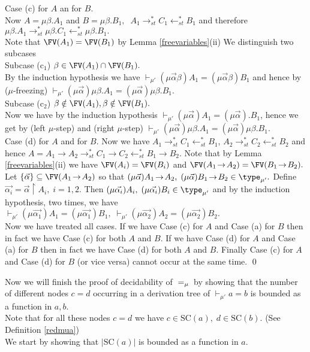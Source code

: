 \documentclass[11pt,aslarticle,xperspectives,bibay3]{asl}
\newcommand\tamua{\type_{\mu'}}
\newcommand\prmua{\vdash_{\mu'}}
\newcommand\redst{\mathrel{\rightarrow^{\ast}_{st}}}
\newcommand\redstl{\mathrel{\leftarrow^{\ast}_{st}}}
\newcommand\alphaarrow{\vec{\alpha}}
\newcommand\alphaiarrow{\vec{\alpha_i}}
\newcommand\alphaeenarrow{\vec{\alpha_1}}
\newcommand\alphatweearrow{\vec{\alpha_2}}
\newcommand\restricted{\!\!\upharpoonright\!\!}
\newcommand\SC{{\mbox {SC}}}
\begin{document}
{Case (c) for $A$ an for $B$.\\
 Now $A=\mu\beta.A_1$ and $B=\mu\beta.B_1,\;\;  A_1\redst C_1\redstl B_1$ and therefore\\ $\mu\beta.A_1\redst \mu\beta.C_1\redstl \mu\beta.B_1.$\\
Note that $\FV(A_1) = \FV(B_1)$ by Lemma \ref{freevariables}(ii)
We distinguish two subcases\\[1em]
Subcase (c$_1$)  $\beta\in\FV(A_1)\cap\FV(B_1).$\\
By the induction hypothesis we have $\prmua(\mu\alphaarrow\beta)A_1=(\mu\alphaarrow\beta)B_1$ and hence by ($\mu$-freezing)  $\prmua(\mu\alphaarrow)\mu\beta.A_1=(\mu\alphaarrow)\mu\beta.B_1.$\\[1em]
Subcase (c$_2$)  $\beta\notin\FV(A_1),\beta\notin\FV(B_1).$\\
Now we have by the induction hypothesis $\prmua(\mu\alphaarrow)A_1=(\mu\alphaarrow).B_1$, hence we get by (left $\mu$-step) and (right $\mu$-step) 
$\prmua(\mu\alphaarrow)\mu\beta.A_1=(\mu\alphaarrow)\mu\beta.B_1.$\\[1em]
Case (d) for $A$ and for $B$.
Now we have $A_1\redst C_1\redstl B_1$,  $A_2\redst C_2\redstl B_2$ and hence  $A=A_1\to A_2\redst C_1\to C_2\redstl B_1\to B_2$. Note that by Lemma \ref {freevariables}(ii) we have $\FV(A_i)=\FV(B_i)$ and $\FV(A_1\to A_2)=\FV(B_1\to B_2).$ Let $\{\alphaarrow\}\subseteq\FV(A_1\to A_2)$ so that $(\mu\alphaarrow)A_1\to A_2,\;(\mu\alphaarrow)B_1\to B_2\in\tamua.$ Define $\alphaiarrow=\alphaarrow\restricted A_i,\; i=1,2.$ Then $(\mu\alphaiarrow)A_i,\;(\mu\alphaiarrow)B_i\in\tamua$ and by the induction hypothesis, two times, we have
$\prmua(\mu\alphaeenarrow)A_1=(\mu\alphaeenarrow)B_1,\;\prmua(\mu\alphatweearrow)A_2=(\mu\alphatweearrow)B_2.$\\[1em]
Now we have treated all cases. If we have Case (c) for $A$ and Case (a) for $B$ then in fact we have Case (c) for both $A$ and $B.$ If we have Case (d) for $A$ and Case (a) for $B$ then in fact we have Case (d) for both $A$ and $B.$
Finally Case (c) for $A$ and Case (d) for $B$  (or vice versa) cannot occur at the same time. \qed
\epf

Now we will finish the proof of decidability of ${\; =_{\mu} \,}$ by showing that the number of different nodes $c=d$ occurring in a derivation tree of $\prmua a=b$ is bounded as a function in $a,b.$\\
Note that for all these nodes $c=d$ we have $c\in\SC(a),\;d\in\SC(b)$. (See Definition \ref{redmua})\\
We start by showing that $|\SC(a)|$ is bounded as a function in $a.$

}
\end{document}
